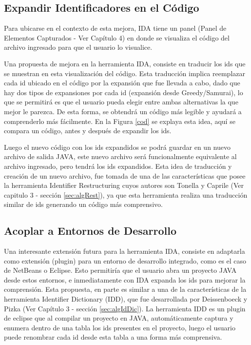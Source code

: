 \subsection{Expandir Identificadores en el Código}

Para ubicarse en el contexto de esta mejora, IDA tiene un panel (Panel de Elementos Capturados - Ver Capítulo 4) en donde se visualiza el código del archivo ingresado para que el usuario lo visualice. 


Una propuesta de mejora en la herramienta IDA, consiste en traducir los ids que se muestran en esta visualización del código.
Esta traducción implica reemplazar cada id ubicado en el código por la expansión que fue llevada a cabo, dado que hay dos tipos de expansiones por cada id (expansión desde Greedy/Samurai), lo que se permitirá es que el usuario pueda elegir entre ambas alternativas la que mejor le parezca. De esta forma, se obtendrá un código más legible y ayudará a comprenderlo más fácilmente. En la Figura \ref{cod} se explaya esta idea, aquí se compara un código, antes y después de expandir los ids.

Luego el nuevo código con los ids expandidos se podrá guardar en un nuevo archivo de salida JAVA, este nuevo archivo será funcionalmente equivalente al archivo ingresado, pero tendrá los ids expandidos. Esta idea de traducción y creación de un nuevo archivo, fue tomada de una de las características que posee la herramienta Identifier Restructuring cuyos autores son Tonella y Caprile (Ver capitulo 3 - sección \ref{sec:algRest}), ya que esta herramienta realiza una traducción similar de ids generando un código más comprensivo.

\subsection{Acoplar a Entornos de Desarrollo}

Una interesante extensión futura para la herramienta IDA, consiste en adaptarla como extensión (plugin) para un entorno de desarrollo integrado, como es el caso de NetBeans o Eclipse. Esto permitiría que el usuario abra un proyecto JAVA desde estos entornos, e inmediatamente con IDA expanda los ids para mejorar la comprensión. Esta propuesta, en parte es similar a una de la características de la herramienta Identifier Dictionary (IDD), que fue desarrollada por Deissenboeck y Pizka (Ver Capítulo 3 - sección \ref{sec:algIdDic}). La herramienta IDD es un plugin de eclipse que al compilar un proyecto en JAVA, automáticamente captura y enumera dentro de una tabla los ids presentes en el proyecto, luego el usuario puede renombrar cada id desde esta tabla a una forma más comprensiva.

